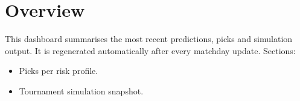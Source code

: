 \section*{Overview}
This dashboard summarises the most recent predictions, picks and simulation
output. It is regenerated automatically after every matchday update.
Sections:
\begin{itemize}
  \item Picks per risk profile.
  \item Tournament simulation snapshot.
\end{itemize}
